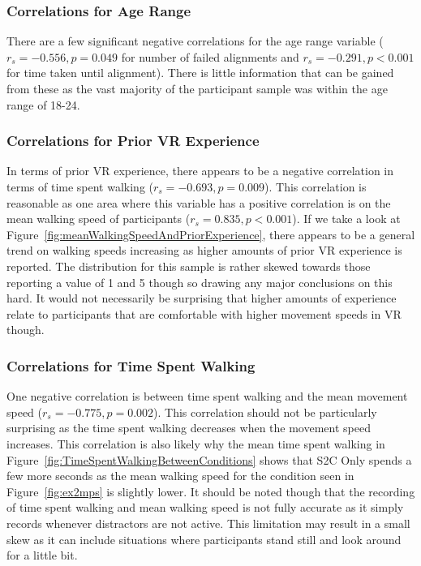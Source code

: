\subsubsection{Correlations for Age Range}
There are a few significant negative correlations for the age range variable ($r_s = -0.556, p = 0.049$ for number of failed alignments and $r_s = -0.291, p < 0.001$ for time taken until alignment). There is little information that can be gained from these as the vast majority of the participant sample was within the age range of 18-24. 

\subsubsection{Correlations for Prior VR Experience}
In terms of prior VR experience, there appears to be a negative correlation in terms of time spent walking ($r_s = -0.693, p = 0.009$). This correlation is reasonable as one area where this variable has a positive correlation is on the mean walking speed of participants ($r_s = 0.835, p < 0.001$). If we take a look at Figure~\ref{fig:meanWalkingSpeedAndPriorExperience}, there appears to be a general trend on walking speeds increasing as higher amounts of prior VR experience is reported. The distribution for this sample is rather skewed towards those reporting a value of 1 and 5 though so drawing any major conclusions on this hard. It would not necessarily be surprising that higher amounts of experience relate to participants that are comfortable with higher movement speeds in VR though.

\subsubsection{Correlations for Time Spent Walking}
One negative correlation is between time spent walking and the mean movement speed ($r_s = -0.775, p = 0.002$). This correlation should not be particularly surprising as the time spent walking decreases when the movement speed increases. This correlation is also likely why the mean time spent walking in Figure~\ref{fig:TimeSpentWalkingBetweenConditions} shows that S2C Only spends a few more seconds as the mean walking speed for the condition seen in Figure~\ref{fig:ex2mps} is slightly lower. It should be noted though that the recording of time spent walking and mean walking speed is not fully accurate as it simply records whenever distractors are not active. This limitation may result in a small skew as it can include situations where participants stand still and look around for a little bit. 

